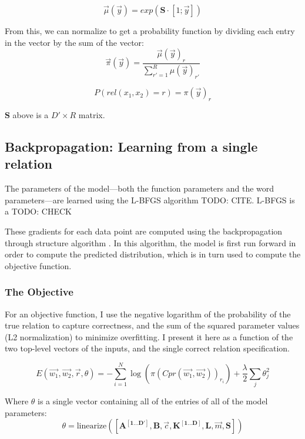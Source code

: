 \documentclass[12pt,leqno,tbtags,twoside]{article}
\theoremstyle{dotless}
\begin{document}
\begin{equation}
\vec{\mu}(\vec{y}) = exp(\mathbf{S}\cdot[1; \vec{y}])
\end{equation}

From this, we can normalize to get a probability function by dividing each entry in the vector by the sum of the vector:
\begin{equation}
\vec{\pi}(\vec{y}) = \frac{\vec{\mu}(\vec{y})_r}{\sum_{r' = 1}^R \mu(\vec{y})_{r'}}
\end{equation}

\begin{equation}
P(rel(x_1, x_2)=r) = \pi(\vec{y})_r
\end{equation}

$\mathbf{S}$ above is a $D' \times R$ matrix.


\subsection{Backpropagation: Learning from a single relation}

The parameters of the model---both the function parameters and the word parameters---are learned using the L-BFGS algorithm TODO: CITE. L-BFGS is a TODO: CHECK

These gradients for each data point are computed using the backpropagation through structure algorithm \cite{goller1996learning}. In this algorithm, the model is first run forward in order to compute the predicted distribution, which is in turn used to compute the objective function. 

\subsubsection{The Objective}

For an objective function, I use the negative logarithm of the probability of the true relation to capture correctness, and the sum of the squared parameter values (L2 normalization) to minimize overfitting. I present it here as a function of the two top-level vectors of the inputs, and the single correct relation specification.

\begin{equation}
E(\vec{w_1}, \vec{w_2}, \vec{r}, \theta) = - \sum_{i=1}^N \log(\pi(Cpr(\vec{w_1}, \vec{w_2}))_{r_i}) + \frac{\lambda}{2}\sum_j\theta_j^2
\end{equation}

Where $\theta$ is a single vector containing all of the entries of all of the model parameters:
\begin{equation}
\theta = \text{linearize}([\mathbf{A^{[1...D']}}, \mathbf{B}, \vec{c}, \mathbf{K^{[1...D]}}, \mathbf{L}, \vec{m}, \mathbf{S}])
\end{equation}
\end{document}
